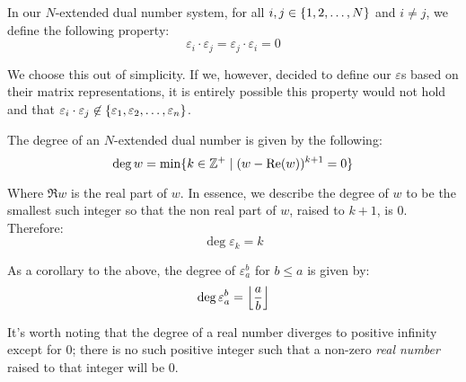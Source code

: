 \begin{theorem}
    In our $N$-extended dual number system, for all $i,j\in\br{1,2,\dots,N}$ and $i\neq j$, we define the following property:
    $$
        \varepsilon_i\cdot\varepsilon_j=\varepsilon_j\cdot\varepsilon_i=0
    $$

    We choose this out of simplicity. If we, however, decided to define our $\varepsilon$s based on their matrix representations, it is entirely possible this property would not hold and that $\varepsilon_i\cdot \varepsilon_j\not\in\br{\varepsilon_1,\varepsilon_2,\dots,\varepsilon_n}$.
\end{theorem}

\begin{theorem}
    The degree of an $N$-extended dual number is given by the following:
    $$
        \deg{w}=\min\br{k\in\mathbb{Z}^+\mid (w-\Re{w})^{k+1}=0}
    $$

    Where $\Re{w}$ is the real part of $w$. In essence, we describe the degree of $w$ to be the smallest such integer so that the non real part of $w$, raised to $k+1$, is 0. Therefore:
    $$
        \deg{\varepsilon_k}=k
    $$

    As a corollary to the above, the degree of $\varepsilon_{a}^{b}$ for $b\leq a$ is given by:
    $$
        \deg{\varepsilon_{a}^{b}}=\floor*{\frac{a}{b}}
    $$

    It's worth noting that the degree of a real number diverges to positive infinity except for $0$; there is no such positive integer such that a non-zero \textit{real number} raised to that integer will be $0$.
\end{theorem}


